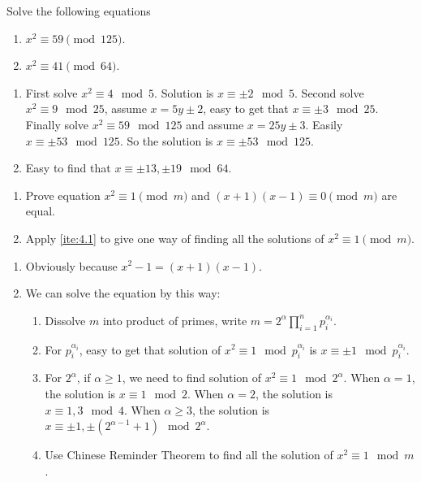 \documentclass{ctexart}
\begin{document}
\begin{problem}\label{pro:3}
  Solve the following equations
  \begin{enumerate}
    \item \(x^2 \equiv 59 \pmod{125}\).
    \item \(x^2 \equiv 41 \pmod{64}\).
  \end{enumerate}
\end{problem}
\begin{solution}
  \begin{enumerate}
    \item First solve \(x^2 \equiv 4 \mod 5\). Solution is \(x \equiv \pm 2 \mod 5\).
      Second solve \(x^2 \equiv 9 \mod 25\), assume \(x=5y \pm 2\), easy to get that \(x \equiv \pm 3 \mod 25\).
      Finally solve \(x^2 \equiv 59 \mod 125\) and assume \(x = 25y \pm 3\). Easily \(x \equiv \pm 53 \mod 125\).
      So the solution is \(x \equiv \pm 53 \mod 125\).
    \item Easy to find that \(x \equiv \pm 13,\pm 19 \mod 64\).
  \end{enumerate}
\end{solution}

\begin{problem}\label{pro:4}
  \begin{enumerate}
    \item \label{ite:4.1} Prove equation \(x^2 \equiv 1 \pmod{m}\) and \((x + 1)(x-1) \equiv 0 \pmod{m}\) are equal.
    \item Apply \ref{ite:4.1} to give one way of finding all the solutions of \(x^2 \equiv 1 \pmod{m}\).
  \end{enumerate}
\end{problem}
\begin{solution}
  \begin{enumerate}
    \item Obviously because \(x^2-1=(x+1)(x-1)\).
    \item We can solve the equation by this way:
      \begin{enumerate}
        \item Dissolve \(m\) into product of primes, write \(m=2^{\alpha}\prod_{i=1}^{n} p_i^{\alpha_i}\).
        \item For \(p_i^{\alpha_i}\), easy to get that solution of \(x^2 \equiv 1 \mod p_i^{\alpha_i}\) is \(x \equiv \pm 1 \mod p_i^{\alpha_i}\).
        \item For \(2^\alpha\), if \(\alpha \geq 1\), we need to find solution of \(x^2 \equiv 1 \mod 2^\alpha\).
          When \(\alpha=1\), the solution is \(x \equiv 1 \mod 2\).
          When \(\alpha=2\), the solution is \(x \equiv 1,3 \mod 4\).
          When \(\alpha \geq 3\), the solution is \(x \equiv \pm 1,\pm (2^{\alpha-1}+1) \mod 2^\alpha\).
        \item Use Chinese Reminder Theorem to find all the solution of \(x^2 \equiv 1 \mod m\).
      \end{enumerate}
  \end{enumerate}
\end{solution}
\end{document}
